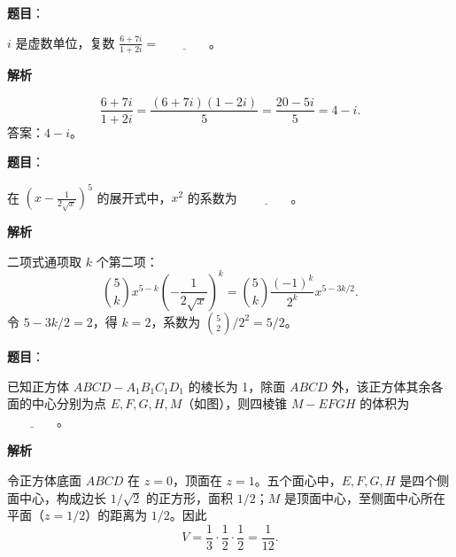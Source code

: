 \begin{answer}

\textbf{题目}：

$i$ 是虚数单位，复数 $\frac{6+7i}{1+2i}=\underline{\qquad\qquad}$。

\textbf{解析}

\nopagebreak[4]
\[\frac{6+7i}{1+2i}=\frac{(6+7i)(1-2i)}{5}=\frac{20-5i}{5}=4-i.\]
答案：$4-i$。


\end{answer}
\begin{answer}

\textbf{题目}：

在 $\left(x-\frac{1}{2\sqrt{x}}\right)^5$ 的展开式中，$x^2$ 的系数为 $\underline{\qquad\qquad}$。

\textbf{解析}

二项式通项取 $k$ 个第二项：
\nopagebreak[4]
\[\binom5k x^{5-k}\left(-\frac1{2\sqrt{x}}\right)^k
=\binom5k\frac{(-1)^k}{2^k}x^{5-3k/2}.\]
令 $5-3k/2=2$，得 $k=2$，系数为 $\binom52/2^2=5/2$。


\end{answer}
\begin{answer}

\textbf{题目}：

已知正方体 $ABCD-A_1B_1C_1D_1$ 的棱长为 1，除面 $ABCD$ 外，该正方体其余各面的中心分别为点 $E,F,G,H,M$（如图），则四棱锥 $M-EFGH$ 的体积为 $\underline{\qquad\qquad}$。
\nopagebreak[4]
\begin{center}\end{center}
\nopagebreak[4]
\textbf{解析}

令正方体底面 $ABCD$ 在 $z=0$，顶面在 $z=1$。五个面心中，$E,F,G,H$ 是四个侧面中心，构成边长 $1/\sqrt2$ 的正方形，面积 $1/2$；$M$ 是顶面中心，至侧面中心所在平面（$z=1/2$）的距离为 $1/2$。因此
\nopagebreak[4]
\[V=\frac13\cdot\frac12\cdot\frac12=\frac1{12}.\]


\end{answer}
